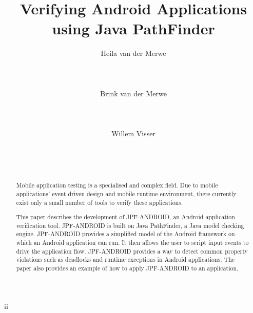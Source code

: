 \documentclass{acm_proc_article-sp}
\begin{document}
\title{Verifying Android Applications using Java PathFinder}


\author{%
\alignauthor Heila van der Merwe\\
       \\
       \\
       \\
\alignauthor  Brink van der Merwe\\
 \\
       \\
       \\
\alignauthor  Willem Visser\\
 \\
       \\
       \\
}

\maketitle

\begin{abstract}
Mobile application testing is a specialised and complex field. Due to mobile applications' event driven design and mobile runtime
environment, there currently exist only a small number of tools to verify these applications.

This paper describes the development of JPF-ANDROID, an Android application verification tool. JPF-ANDROID is built on Java PathFinder, 
a Java model checking engine. JPF-ANDROID provides a simplified model of the Android framework on which an Android application can run. It then allows
the user to script input events to drive the application flow. JPF-ANDROID provides a way to detect common property violations such as deadlocks and runtime exceptions
in Android applications. The paper also provides an example of how to apply JPF-ANDROID to an application.
\end{abstract}ii
\end{document}
